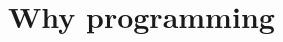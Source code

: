 \documentclass[10pt,xcolor={table,dvipsnames},t]{beamer}
\begin{document}
\section{Why programming}

  

\end{document}
